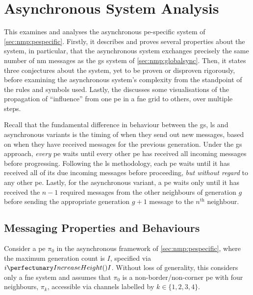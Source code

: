 \section{\label{sec:nmp:analysis}Asynchronous System Analysis}

This  examines and analyses the asynchronous \gls{pe}-specific system of \cref{sec:nmp:pespecific}.  Firstly, it describes and proves several properties about the system, in particular, that the asynchronous system exchanges precisely the same number of \gls{nm} messages as the \gls{gs} system of \cref{sec:nmp:globalsync}.  Then, it states three conjectures about the system, yet to be proven or disproven rigorously, before examining the asynchronous system's complexity from the standpoint of the rules and symbols used.  Lastly, the  discusses some visualisations of the propagation of ``influence'' from one \gls{pe} in a \gls{fne} grid to others, over multiple steps.

Recall that the fundamental difference in behaviour between the \gls{gs}, \gls{ls} and asynchronous variants is the timing of when they send out new messages, based on when they have received messages for the previous generation.  Under the \gls{gs} approach, \emph{every} \gls{pe} waits until every other \gls{pe} has received all incoming messages before progressing.  Following the \gls{ls} methodology, each \gls{pe} waits until it has received all of its due incoming messages before proceeding, \emph{but without regard} to any other \gls{pe}.  Lastly, for the asynchronous variant, a \gls{pe} waits only until it has received the \(n - 1\) required messages from the other neighbours of generation \(g\) before sending the appropriate generation \(g + 1\) message to the \(n^\text{th}\) neighbour.

\subsection{\label{sec:nmp:msgprops}Messaging Properties and Behaviours}

Consider a \gls{pe} $\pi_0$ in the asynchronous framework of \cref{sec:nmp:pespecific},
where the maximum generation count is $I$, specified via $\cpfunc{i}{I}$.
Without loss of generality, 
this  considers only a \gls{fne} system and
assumes that $\pi_0$ is a non-border/non-corner \gls{pe} with four neighbours, 
$\pi_k$, accessible via channels labelled by $k \in \{ 1, 2, 3, 4 \}$. 

